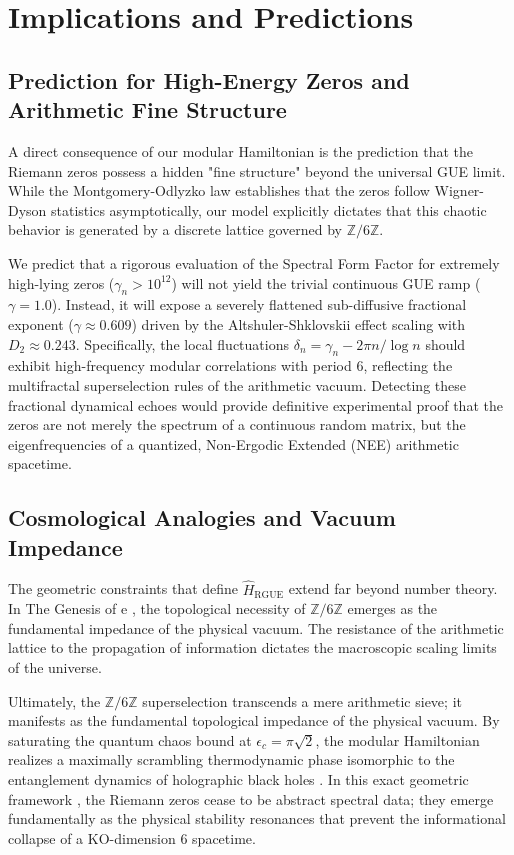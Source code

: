\documentclass[aps,prl,preprint,superscriptaddress,floatfix]{revtex4-2}
\newcommand{\Zmod}{\mathbb{Z}/6\mathbb{Z}}
\begin{document}
\section{Implications and Predictions}

\subsection{Prediction for High-Energy Zeros and Arithmetic Fine Structure}

A direct consequence of our modular Hamiltonian is the prediction that the Riemann zeros possess a hidden "fine structure" beyond the universal GUE limit. While the Montgomery-Odlyzko law establishes that the zeros follow Wigner-Dyson statistics asymptotically, our model explicitly dictates that this chaotic behavior is generated by a discrete lattice governed by $\Zmod$.

We predict that a rigorous evaluation of the Spectral Form Factor for extremely high-lying zeros ($\gamma_n > 10^{12}$) will not yield the trivial continuous GUE ramp ($\gamma = 1.0$). Instead, it will expose a severely flattened sub-diffusive fractional exponent ($\gamma \approx 0.609$) driven by the Altshuler-Shklovskii effect scaling with $D_2 \approx 0.243$. Specifically, the local fluctuations $\delta_n = \gamma_n - 2\pi n/\log n$ should exhibit high-frequency modular correlations with period 6, reflecting the multifractal superselection rules of the arithmetic vacuum. Detecting these fractional dynamical echoes would provide definitive experimental proof that the zeros are not merely the spectrum of a continuous random matrix, but the eigenfrequencies of a quantized, Non-Ergodic Extended (NEE) arithmetic spacetime.

\subsection{Cosmological Analogies and Vacuum Impedance}

The geometric constraints that define $\hat{H}_{\text{RGUE}}$ extend far beyond number theory. In The Genesis of e \cite{PeinadorGenesis}, the topological necessity of $\Zmod$ emerges as the fundamental impedance of the physical vacuum. The resistance of the arithmetic lattice to the propagation of information dictates the macroscopic scaling limits of the universe.

Ultimately, the $\Zmod$ superselection transcends a mere arithmetic sieve; it manifests as the fundamental topological impedance of the physical vacuum. By saturating the quantum chaos bound at $\epsilon_c = \pi\sqrt{2}$, the modular Hamiltonian realizes a maximally scrambling thermodynamic phase isomorphic to the entanglement dynamics of holographic black holes \cite{Saad2019}. In this exact geometric framework \cite{ConnesConsani2021}, the Riemann zeros cease to be abstract spectral data; they emerge fundamentally as the physical stability resonances that prevent the informational collapse of a KO-dimension 6 spacetime.
\end{document}
